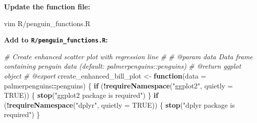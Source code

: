 \documentclass[
]{article}
\newenvironment{Shaded}{\begin{snugshade}}{\end{snugshade}}
\newcommand{\AttributeTok}[1]{\textcolor[rgb]{0.13,0.29,0.53}{#1}}
\newcommand{\CommentTok}[1]{\textcolor[rgb]{0.56,0.35,0.01}{\textit{#1}}}
\newcommand{\ConstantTok}[1]{\textcolor[rgb]{0.56,0.35,0.01}{#1}}
\newcommand{\ControlFlowTok}[1]{\textcolor[rgb]{0.13,0.29,0.53}{\textbf{#1}}}
\newcommand{\ExtensionTok}[1]{#1}
\newcommand{\FunctionTok}[1]{\textcolor[rgb]{0.13,0.29,0.53}{\textbf{#1}}}
\newcommand{\NormalTok}[1]{#1}
\newcommand{\OtherTok}[1]{\textcolor[rgb]{0.56,0.35,0.01}{#1}}
\newcommand{\SpecialCharTok}[1]{\textcolor[rgb]{0.81,0.36,0.00}{\textbf{#1}}}
\newcommand{\StringTok}[1]{\textcolor[rgb]{0.31,0.60,0.02}{#1}}
\begin{document}
\textbf{Update the function file:}

\begin{Shaded}
\begin{Highlighting}[]
\ExtensionTok{vim}\NormalTok{ R/penguin\_functions.R}
\end{Highlighting}
\end{Shaded}

\textbf{Add to \texttt{R/penguin\_functions.R}:}

\begin{Shaded}
\begin{Highlighting}[]
\CommentTok{\#\textquotesingle{} Create enhanced scatter plot with regression line}
\CommentTok{\#\textquotesingle{} }
\CommentTok{\#\textquotesingle{} @param data Data frame containing penguin data (default: palmerpenguins::penguins)}
\CommentTok{\#\textquotesingle{} @return ggplot object}
\CommentTok{\#\textquotesingle{} @export}
\NormalTok{create\_enhanced\_bill\_plot }\OtherTok{\textless{}{-}} \ControlFlowTok{function}\NormalTok{(}\AttributeTok{data =}\NormalTok{ palmerpenguins}\SpecialCharTok{::}\NormalTok{penguins) \{}
  \ControlFlowTok{if}\NormalTok{ (}\SpecialCharTok{!}\FunctionTok{requireNamespace}\NormalTok{(}\StringTok{"ggplot2"}\NormalTok{, }\AttributeTok{quietly =} \ConstantTok{TRUE}\NormalTok{)) \{}
    \FunctionTok{stop}\NormalTok{(}\StringTok{"ggplot2 package is required"}\NormalTok{)}
\NormalTok{  \}}
  \ControlFlowTok{if}\NormalTok{ (}\SpecialCharTok{!}\FunctionTok{requireNamespace}\NormalTok{(}\StringTok{"dplyr"}\NormalTok{, }\AttributeTok{quietly =} \ConstantTok{TRUE}\NormalTok{)) \{}
    \FunctionTok{stop}\NormalTok{(}\StringTok{"dplyr package is required"}\NormalTok{)}
\NormalTok{  \}}
  

\end{Highlighting}
\end{Shaded}
\end{document}

